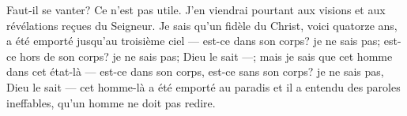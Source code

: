 Faut-il se vanter? Ce n’est pas utile.
J’en viendrai pourtant aux visions et aux révélations reçues du Seigneur.
Je sais qu’un fidèle du Christ, voici quatorze ans, a été emporté jusqu’au troisième ciel
	--- est-ce dans son corps? je ne sais pas;
	est-ce hors de son corps? je ne sais pas; Dieu le sait ---;
	mais je sais que cet homme dans cet état-là
	--- est-ce dans son corps, est-ce sans son corps?
	je ne sais pas, Dieu le sait ---
	cet homme-là a été emporté au paradis
	et il a entendu des paroles ineffables, qu’un homme ne doit pas redire.

